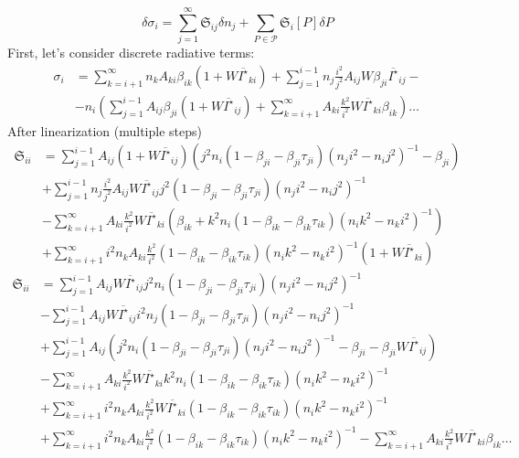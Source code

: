 \documentclass{article}
\begin{document}
\[
    \delta\sigma_i = \sum\limits_{j = 1}^\infty \mathfrak{S}_{ij}\delta n_j + \sum\limits_{P \in \mathcal{P}}\mathfrak{S}_i[P]\delta{P}
\]
First, let's consider discrete radiative terms:
\begin{equation}
    \begin{aligned}
        \sigma_i &= \sum\limits_{k=i+1}^\infty n_kA_{ki}\beta_{ik}(1 + W\overline{I^\star}_{ki}) + \sum\limits_{j=1}^{i-1} n_j\frac{i^2}{j^2}A_{ij}W\beta_{ji} \overline{I^\star}_{ij} -\\
        &-n_i\left(\sum\limits_{j=1}^{i-1}A_{ij}\beta_{ji}(1 + W\overline{I^\star}_{ij}) + \sum\limits_{k=i+1}^\infty A_{ki}\frac{k^2}{i^2}W\overline{I^\star}_{ki}\beta_{ik}\right)\dots 
    \end{aligned}
\end{equation}
After linearization (multiple steps)
\begin{equation}
    \begin{aligned}
        \mathfrak{S}_{ii} &= \sum\limits_{j=1}^{i-1} A_{ij}(1 + W\overline{I^\star}_{ij})\left(j^2n_i (1 - \beta_{ji} - \beta_{ji}\tau_{ji})(n_ji^2 - n_ij^2)^{-1} -\beta_{ji}\right)\\
        &+\sum\limits_{j=1}^{i-1} n_j\frac{i^2}{j^2}A_{ij}W\overline{I^\star}_{ij}j^2(1 - \beta_{ji} - \beta_{ji}\tau_{ji})(n_ji^2 - n_ij^2)^{-1}\\
        &-\sum\limits_{k=i+1}^\infty A_{ki}\frac{k^2}{i^2}W\overline{I^\star}_{ki}(\beta_{ik} + k^2n_i(1 - \beta_{ik} - \beta_{ik}\tau_{ik})(n_ik^2 - n_ki^2)^{-1})\\
        &+\sum\limits_{k=i+1}^\infty i^2n_kA_{ki}\frac{k^2}{i^2}(1 - \beta_{ik} - \beta_{ik}\tau_{ik})(n_ik^2 - n_ki^2)^{-1}(1 + W\overline{I^\star}_{ki})
    \end{aligned}
\end{equation}
\begin{equation}
    \begin{aligned}
        \mathfrak{S}_{ii} &= \sum\limits_{j=1}^{i-1} A_{ij}W\overline{I^\star}_{ij}j^2n_i (1 - \beta_{ji} - \beta_{ji}\tau_{ji})(n_ji^2 - n_ij^2)^{-1}\\
        &-\sum\limits_{j=1}^{i-1} A_{ij}W\overline{I^\star}_{ij}i^2n_j(1 - \beta_{ji} - \beta_{ji}\tau_{ji})(n_ji^2 - n_ij^2)^{-1}\\
        &+\sum\limits_{j=1}^{i-1} A_{ij}\left(j^2n_i (1 - \beta_{ji} - \beta_{ji}\tau_{ji})(n_ji^2 - n_ij^2)^{-1} -\beta_{ji}-\beta_{ji}W\overline{I^\star}_{ij}\right)\\
        &-\sum\limits_{k=i+1}^\infty A_{ki}\frac{k^2}{i^2}W\overline{I^\star}_{ki}k^2n_i(1 - \beta_{ik} - \beta_{ik}\tau_{ik})(n_ik^2 - n_ki^2)^{-1}\\
        &+\sum\limits_{k=i+1}^\infty i^2n_kA_{ki}\frac{k^2}{i^2}W\overline{I^\star}_{ki}(1 - \beta_{ik} - \beta_{ik}\tau_{ik})(n_ik^2 - n_ki^2)^{-1}\\
        &+\sum\limits_{k=i+1}^\infty i^2n_kA_{ki}\frac{k^2}{i^2}(1 - \beta_{ik} - \beta_{ik}\tau_{ik})(n_ik^2 - n_ki^2)^{-1}-\sum\limits_{k=i+1}^\infty A_{ki}\frac{k^2}{i^2}W\overline{I^\star}_{ki}\beta_{ik}\dots
    \end{aligned}
\end{equation}
\end{document}
